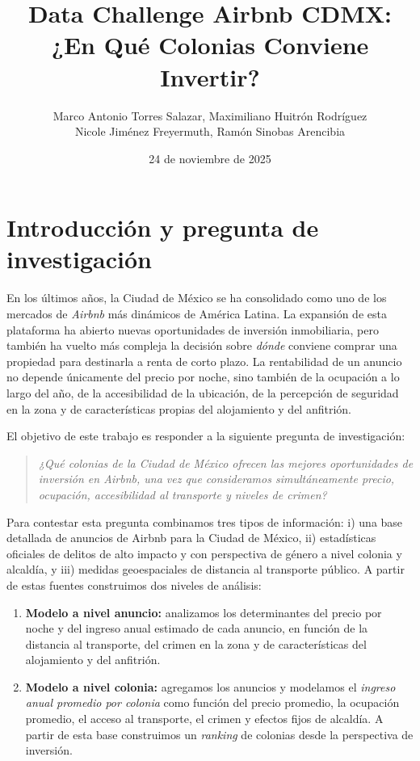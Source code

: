 \documentclass[12pt]{article}
\title{Data Challenge Airbnb CDMX: ¿En Qué Colonias Conviene Invertir?}
\author{Marco Antonio Torres Salazar, Maximiliano Huitrón Rodríguez\\
Nicole Jiménez Freyermuth, Ramón Sinobas Arencibia }
\date{24 de noviembre de 2025}
\begin{document}
\maketitle
\section{Introducción y pregunta de investigación}

En los últimos años, la Ciudad de México se ha consolidado como uno de los mercados de \textit{Airbnb} más dinámicos de América Latina. La expansión de esta plataforma ha abierto nuevas oportunidades de inversión inmobiliaria, pero también ha vuelto más compleja la decisión sobre \emph{dónde} conviene comprar una propiedad para destinarla a renta de corto plazo. La rentabilidad de un anuncio no depende únicamente del precio por noche, sino también de la ocupación a lo largo del año, de la accesibilidad de la ubicación, de la percepción de seguridad en la zona y de características propias del alojamiento y del anfitrión.

El objetivo de este trabajo es responder a la siguiente pregunta de investigación:

\begin{quote}
\emph{¿Qué colonias de la Ciudad de México ofrecen las mejores oportunidades de inversión en Airbnb, una vez que consideramos simultáneamente precio, ocupación, accesibilidad al transporte y niveles de crimen?}
\end{quote}

Para contestar esta pregunta combinamos tres tipos de información: i) una base detallada de anuncios de Airbnb para la Ciudad de México, ii) estadísticas oficiales de delitos de alto impacto y con perspectiva de género a nivel colonia y alcaldía, y iii) medidas geoespaciales de distancia al transporte público. A partir de estas fuentes construimos dos niveles de análisis:

\begin{enumerate}
  \item \textbf{Modelo a nivel anuncio:} analizamos los determinantes del precio por noche y del ingreso anual estimado de cada anuncio, en función de la distancia al transporte, del crimen en la zona y de características del alojamiento y del anfitrión.
  \item \textbf{Modelo a nivel colonia:} agregamos los anuncios y modelamos el \emph{ingreso anual promedio por colonia} como función del precio promedio, la ocupación promedio, el acceso al transporte, el crimen y efectos fijos de alcaldía. A partir de esta base construimos un \textit{ranking} de colonias desde la perspectiva de inversión.
\end{enumerate}
\end{document}
